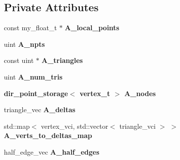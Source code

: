 \subsection*{Private Attributes}
\begin{CompactItemize}
\item 
const my\_\-float\_\-t $\ast$ \textbf{A\_\-local\_\-points}\label{classASCbase_1_1geometry_1_1TriMeshSphere_7ace9bbea8fff45d3dfb5d915adb664e}

\item 
uint \textbf{A\_\-npts}\label{classASCbase_1_1geometry_1_1TriMeshSphere_098883f74c0eed5ecc66f428f48d70a0}

\item 
const uint $\ast$ \textbf{A\_\-triangles}\label{classASCbase_1_1geometry_1_1TriMeshSphere_af90c5e36bec515b764a6394ba50ac4a}

\item 
uint \textbf{A\_\-num\_\-tris}\label{classASCbase_1_1geometry_1_1TriMeshSphere_0775a1f564a7b75cda3723d1a4806ceb}

\item 
\bf{dir\_\-point\_\-storage}$<$ \bf{vertex\_\-t} $>$ \textbf{A\_\-nodes}\label{classASCbase_1_1geometry_1_1TriMeshSphere_dbc874022d8fcc737354707cfaccb77d}

\item 
triangle\_\-vec \textbf{A\_\-deltas}\label{classASCbase_1_1geometry_1_1TriMeshSphere_d5d4d2dcd06c55fc25e58b49be8c2de3}

\item 
std::map$<$ vertex\_\-vci, std::vector$<$ triangle\_\-vci $>$ $>$ \textbf{A\_\-verts\_\-to\_\-deltas\_\-map}\label{classASCbase_1_1geometry_1_1TriMeshSphere_bfb7fca04fe4b2c9245035607914dd47}

\item 
half\_\-edge\_\-vec \textbf{A\_\-half\_\-edges}\label{classASCbase_1_1geometry_1_1TriMeshSphere_f808f7f4a48e4ad6ee7b24a1002fdfbd}

\end{CompactItemize}
